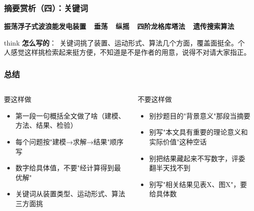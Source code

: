 \documentclass[aspectratio=169]{beamer}
\newcommand{\remark}[2]{%
	\vspace{0.12cm}%
	\begin{beamercolorbox}[rounded=true,sep=6pt]{think}%
		{\color{orchidpurple}\textbf{#1}：}~#2%
	\end{beamercolorbox}%
}
\begin{document}
\begin{frame}
	\frametitle{摘要赏析（四）：关键词}
	\begin{center}
		\vfill
		{\color{orchidpurple}\large\bfseries 振荡浮子式波浪能发电装置\ \ 垂荡\ \ 纵摇\ \ 四阶龙格库塔法\ \ 遗传搜索算法}
		\medskip
		\remark{怎么写的}{关键词挑了装置、运动形式、算法几个方面，覆盖面挺全。个人感觉这样挑检索起来挺方便，不知道是不是作者的用意，说得不对请大家指正。}
		\vfill
	\end{center}
\end{frame}

\begin{frame}
	\frametitle{总结}
	\scriptsize
	\begin{columns}[T]
		\begin{exampleblock}{要这样做}
			\begin{itemize}
				\item 第一段一句概括全文做了啥（建模、方法、结果、检验）
				\item 每个问题按"建模→求解→结果"顺序写
				\item 数字给具体值，不要"经计算得到最优解"
				\item 关键词从装置类型、运动形式、算法三方面挑
			\end{itemize}
		\end{exampleblock}
		\begin{alertblock}{不要这样做}
			\begin{itemize}
				\item 别抄题目的"背景意义"那段当摘要
				\item 别写"本文具有重要的理论意义和实际价值"这种空话
				\item 别把结果藏起来不写数字，评委翻半天找不到
				\item 别写"相关结果见表X、图X"，要给具体数
			\end{itemize}
		\end{alertblock}
	\end{columns}

\end{frame}
\end{document}

